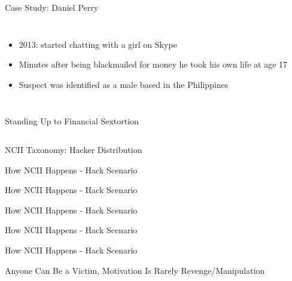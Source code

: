 \documentclass[nobackground,dvipsnames,table,aspectratio=169]{beamer}
\begin{document}
\begin{frame}{Case Study: Daniel Perry}
    \begin{columns}
            \begin{itemize}
                \item 2013: started chatting with a girl on Skype
                \item Minutes after being blackmailed for money he took his own life at age 17
                \item Suspect was identified as a male based in the Philippines
            \end{itemize}
    \end{columns}
\end{frame}

\begin{frame}{Standing Up to Financial Sextortion}
    \begin{columns}
    \end{columns}
\end{frame}

\begin{frame}{NCII Taxonomy: Hacker Distribution}
\end{frame}

\begin{frame}{How NCII Happens - Hack Scenario}
\end{frame}

\begin{frame}{How NCII Happens - Hack Scenario}
\end{frame}

\begin{frame}{How NCII Happens - Hack Scenario}
\end{frame}

\begin{frame}{How NCII Happens - Hack Scenario}
\end{frame}

\begin{frame}{How NCII Happens - Hack Scenario}
\end{frame}

\begin{frame}{Anyone Can Be a Victim, Motivation Is Rarely Revenge/Manipulation}
    \begin{columns}
            \begin{columns}
            \end{columns}
    \end{columns}
\end{frame}
\end{document}
